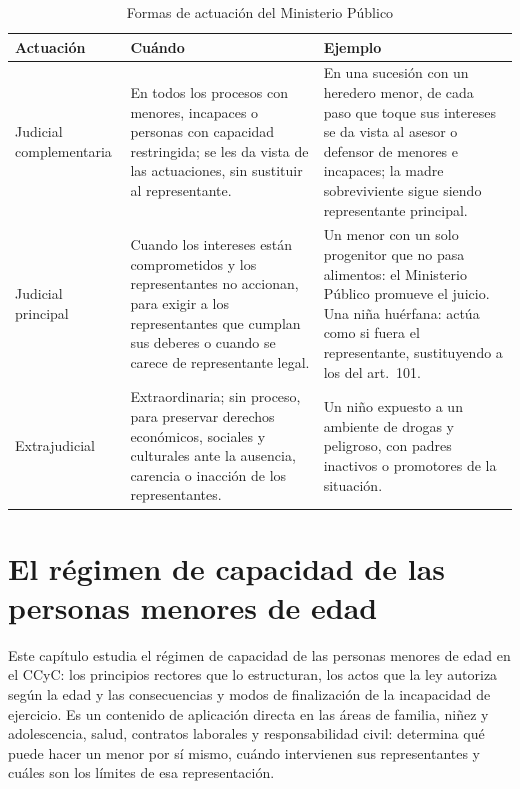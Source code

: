 \documentclass[12pt,oneside]{book}
\begin{document}
\begin{table}[H]
\centering
\begin{tabularx}{\textwidth}{B{0.20\textwidth} Y Y}
\toprule
\textbf{Actuación} & \textbf{Cuándo} & \textbf{Ejemplo} \\
\midrule
Judicial complementaria & En todos los procesos con menores, incapaces o personas con capacidad restringida; se les da vista de las actuaciones, sin sustituir al representante. & En una sucesión con un heredero menor, de cada paso que toque sus intereses se da vista al asesor o defensor de menores e incapaces; la madre sobreviviente sigue siendo representante principal. \\
Judicial principal & Cuando los intereses están comprometidos y los representantes no accionan, para exigir a los representantes que cumplan sus deberes o cuando se carece de representante legal. & Un menor con un solo progenitor que no pasa alimentos: el Ministerio Público promueve el juicio. Una niña huérfana: actúa como si fuera el representante, sustituyendo a los del art.~101. \\
Extrajudicial & Extraordinaria; sin proceso, para preservar derechos económicos, sociales y culturales ante la ausencia, carencia o inacción de los representantes. & Un niño expuesto a un ambiente de drogas y peligroso, con padres inactivos o promotores de la situación. \\
\bottomrule
\end{tabularx}
\caption{Formas de actuación del Ministerio Público}
\end{table}


\chapter{El régimen de capacidad de las personas menores de edad}
\label{cap:menores}

Este capítulo estudia el régimen de capacidad de las personas menores de edad en el CCyC: los principios rectores que lo estructuran, los actos que la ley autoriza según la edad y las consecuencias y modos de finalización de la incapacidad de ejercicio. Es un contenido de aplicación directa en las áreas de familia, niñez y adolescencia, salud, contratos laborales y responsabilidad civil: determina qué puede hacer un menor por sí mismo, cuándo intervienen sus representantes y cuáles son los límites de esa representación.
\end{document}
